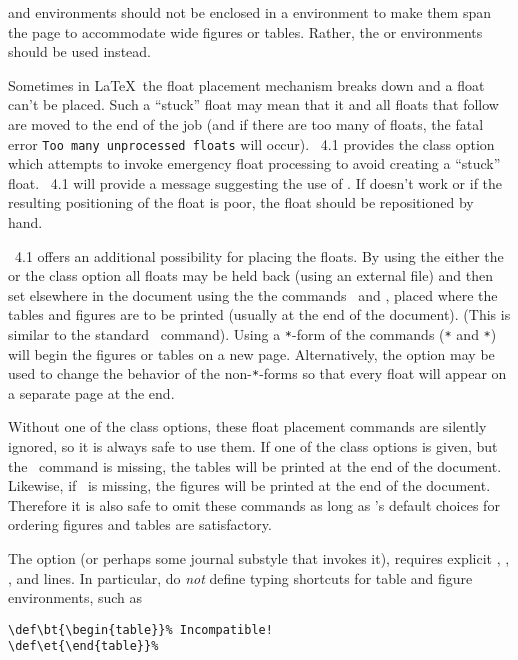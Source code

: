 \documentclass[%
,aps%
 ,twocolumn%
 ,secnumarabic%
,amssymb, amsmath,nobibnotes, aps, prl, floatfix]{revtex4-1}
\begin{document}
 and  environments should not 
be enclosed in a  environment to make them span
the page to accommodate wide figures or tables. Rather, the
 or  environments should be used instead.

Sometimes in \LaTeX\ the float placement mechanism breaks down and a
float can't be placed. Such a ``stuck'' float may mean that it and all
floats that follow are moved to the end of the job (and if there are
too many of floats, the fatal error \texttt{Too many unprocessed floats}
will occur). \revtex~4.1 provides the class option
 which attempts to invoke emergency float
processing to avoid creating a ``stuck'' float. \revtex~4.1 will provide
a message suggesting the use of
. If  doesn't work or if
the resulting positioning of the float is poor, the float should be
repositioned by hand.

\revtex~4.1 offers an additional possibility for placing the floats. By
using the either the  or the
 class option all floats may be held
back (using an external file) and then set elsewhere in the document
using the the commands \cmd\printtables\ and \cmd\printfigures{},
placed where the tables and figures are to be printed (usually at the
end of the document).  (This is similar to the standard
\cmd\printindex\ command). Using a \texttt{*}-form of the commands
(\cmd\printfigures\verb+*+ and
\cmd\printtables\verb+*+) will begin the figures
or tables on a new page. Alternatively, the option
 may be used to change the behavior of the
non-\texttt{*}-forms so that every float will appear on a separate
page at the end.

Without one of the  class options, these float
placement commands are silently ignored, so it is always safe to use
them.  If one of the  class options is given,
but the \cmd\printtables\ command is missing, the tables will be
printed at the end of the document. Likewise, if \cmd\printfigures\ is
missing, the figures will be printed at the end of the document.
Therefore it is also safe to omit these commands as long as \revtex's
default choices for ordering figures and tables are satisfactory.

The  option (or perhaps some journal substyle
that invokes it), requires explicit , ,
, and  lines. In particular, do \emph{not}
define typing shortcuts for table and figure environments, such as
\begin{verbatim}
\def\bt{\begin{table}}% Incompatible!
\def\et{\end{table}}%
\end{verbatim}
\end{document}
